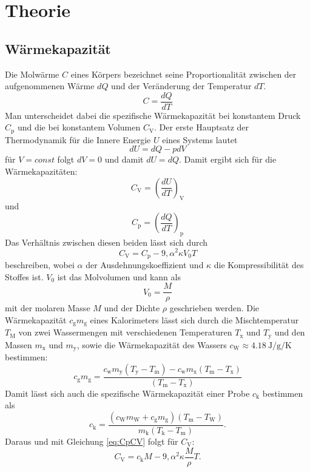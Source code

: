 
\section{Theorie}
\label{sec:Theorie}

\subsection{Wärmekapazität}
Die Molwärme $C$ eines Körpers bezeichnet seine Proportionalität zwischen der aufgenommenen Wärme $dQ$ und der Veränderung der Temperatur $dT$.
\begin{equation}
C = \frac{dQ}{dT} \label{eq:C}
\end{equation}
Man unterscheidet dabei die spezifische Wärmekapazität bei konstantem Druck $C_\text{p}$ und die bei konstantem Volumen $C_\text{V}$.\newline
Der erste Hauptsatz der Thermodynamik für die Innere Energie $U$ eines Systems lautet \[dU=dQ-pdV\]
für $V = const$ folgt $dV = 0$ und damit $dU = dQ$.
Damit ergibt sich für die Wärmekapazitäten:
\begin{equation}
C_\text{V} = \left(\frac{dU}{dT}\right)_\text{V} \label{eq:CV}
\end{equation}
und 
\begin{equation}
C_\text{p} = \left(\frac{dQ}{dT}\right)_\text{p} \label{eq:Cp}
\end{equation}
Das Verhältnis zwischen diesen beiden lässt sich durch
\begin{equation}
C_\text{V}= C_\text{p} - 9,\alpha^2\kappa V_0T \label{eq:CpCV}
\end{equation}
beschreiben\cite{V201}, wobei $\alpha$ der Ausdehnungskoeffizient und $\kappa$ die Kompressibilität des Stoffes ist.
$V_0$ ist das Molvolumen und kann als 
\begin{equation*}
V_0 = \frac{M}{\rho}
\end{equation*}
mit der molaren Masse $M$ und der Dichte $\rho$ geschrieben werden.
Die Wärmekapazität $c_\text{g}m_\text{g}$ eines Kalorimeters lässt sich durch die Mischtemperatur $T_\text{M}$ von zwei Wassermengen mit verschiedenen Temperaturen $T_\text{x}$ und $T_\text{y}$ und den Massen $m_\text{x}$ und $m_\text{y}$, sowie die Wärmekapazität des Wassers $c_\text{W}\approx \SI{4,18}{\joule\per\gram\per\kelvin}$ bestimmen\cite{V201}:
\begin{equation}
c_\text{g}m_\text{g} =\frac{ c_\text{w}m_\text{y}(T_\text{y}-T_\text{m})- c_\text{w}m_\text{x}(T_\text{m}-T_\text{x})}{(T_\text{m}-T_\text{x})} \label{eq:cgmg}
\end{equation}
Damit lässt sich auch die spezifische Wärmekapazität einer Probe $c_\text{k}$ bestimmen als \cite{V201}
\begin{equation}
c_\text{k} =\frac{( c_\text{W}m_\text{W}+ c_\text{g}m_\text{g})(T_\text{m}-T_\text{W})}{m_\text{k}(T_\text{k}-T_\text{m})}. \label{eq:ck}
\end{equation}
Daraus und mit Gleichung \eqref{eq:CpCV} folgt für $C_\text{V}$: 
\begin{equation}
C_\text{V}= c_\text{k}M - 9,\alpha^2\kappa \frac{M}{\rho}T. \label{eq:ckCV}
\end{equation}
